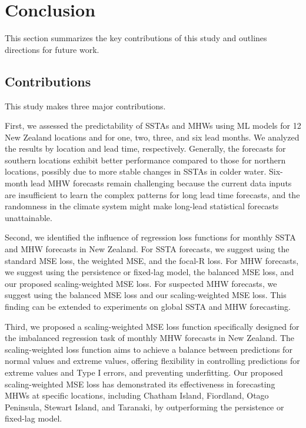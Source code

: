 \documentclass[11pt, a4paper]{article}
\begin{document}
\section{Conclusion}

This section summarizes the key contributions of this study and outlines directions for future work.

\subsection{Contributions}

This study makes three major contributions.

First, we assessed the predictability of SSTAs and MHWs using ML models for 12 New Zealand locations and for one, two, three, and six lead months. We analyzed the results by location and lead time, respectively. Generally, the forecasts for southern locations exhibit better performance compared to those for northern locations, possibly due to more stable changes in SSTAs in colder water. Six-month lead MHW forecasts remain challenging because the current data inputs are insufficient to learn the complex patterns for long lead time forecasts, and the randomness in the climate system might make long-lead statistical forecasts unattainable.

Second, we identified the influence of regression loss functions for monthly SSTA and MHW forecasts in New Zealand. For SSTA forecasts, we suggest using the standard MSE loss, the weighted MSE, and the focal-R loss. For MHW forecasts, we suggest using the persistence or fixed-lag model, the balanced MSE loss, and our proposed scaling-weighted MSE loss. For suspected MHW forecasts, we suggest using the balanced MSE loss and our scaling-weighted MSE loss. This finding can be extended to experiments on global SSTA and MHW forecasting.

Third, we proposed a scaling-weighted MSE loss function specifically designed for the imbalanced regression task of monthly MHW forecasts in New Zealand. The scaling-weighted loss function aims to achieve a balance between predictions for normal values and extreme values, offering flexibility in controlling predictions for extreme values and Type I errors, and preventing underfitting. Our proposed scaling-weighted MSE loss has demonstrated its effectiveness in forecasting MHWs at specific locations, including Chatham Island, Fiordland, Otago Peninsula, Stewart Island, and Taranaki, by outperforming the persistence or fixed-lag model.
\end{document}
